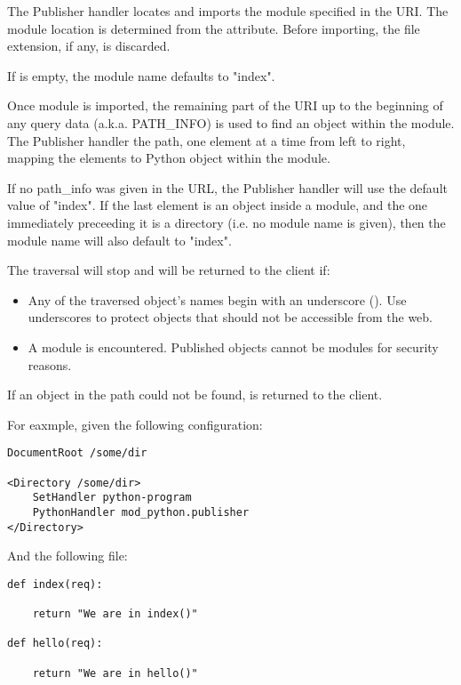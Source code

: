 The Publisher handler locates and imports the module specified in the
URI. The module location is determined from the 
attribute. Before importing, the file extension, if any, is
discarded. 

If  is empty, the module name defaults to "index".

Once module is imported, the remaining part of the URI up to the
beginning of any query data (a.k.a. PATH_INFO) is used to find an
object within the module. The Publisher handler  the 
path, one element at a time from left to right, mapping the elements
to Python object within the module.

If no path_info was given in the URL, the Publisher handler will use
the default value of "index". If the last element is an object inside
a module, and the one immediately preceeding it is a directory
(i.e. no module name is given), then the module name will also default
to "index".

The traversal will stop and  will be returned to
the client if:

\begin{itemize}

\item
Any of the traversed object's names begin with an underscore
(\samp{\_}). Use underscores to protect objects that should not be
accessible from the web.

\item
A module is encountered. Published objects cannot be modules for
security reasons.

\end{itemize}

If an object in the path could not be found, 
is returned to the client.

For eaxmple, given the following configuration:

\begin{verbatim}
DocumentRoot /some/dir

<Directory /some/dir>
    SetHandler python-program
    PythonHandler mod_python.publisher
</Directory>
\end{verbatim}

And the following  file:

\begin{verbatim}
def index(req):

    return "We are in index()"

def hello(req):

    return "We are in hello()"
\end{verbatim}

